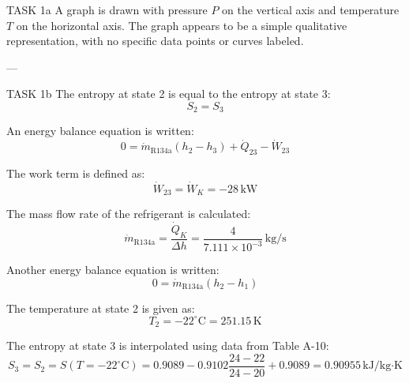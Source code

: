 TASK 1a  
A graph is drawn with pressure \( P \) on the vertical axis and temperature \( T \) on the horizontal axis. The graph appears to be a simple qualitative representation, with no specific data points or curves labeled.

---

TASK 1b  
The entropy at state 2 is equal to the entropy at state 3:  
\[
S_2 = S_3
\]

An energy balance equation is written:  
\[
0 = \dot{m}_{\text{R134a}} \left( h_2 - h_3 \right) + \dot{Q}_{23} - \dot{W}_{23}
\]

The work term is defined as:  
\[
\dot{W}_{23} = \dot{W}_K = -28 \, \text{kW}
\]

The mass flow rate of the refrigerant is calculated:  
\[
\dot{m}_{\text{R134a}} = \frac{\dot{Q}_K}{\Delta h} = \frac{4}{7.111 \times 10^{-3}} \, \text{kg/s}
\]

Another energy balance equation is written:  
\[
0 = \dot{m}_{\text{R134a}} \left( h_2 - h_1 \right)
\]

The temperature at state 2 is given as:  
\[
T_2 = -22^\circ\text{C} = 251.15 \, \text{K}
\]

The entropy at state 3 is interpolated using data from Table A-10:  
\[
S_3 = S_2 = S(T = -22^\circ\text{C}) = 0.9089 - 0.9102 \frac{24 - 22}{24 - 20} + 0.9089 = 0.90955 \, \text{kJ/kg·K}
\]